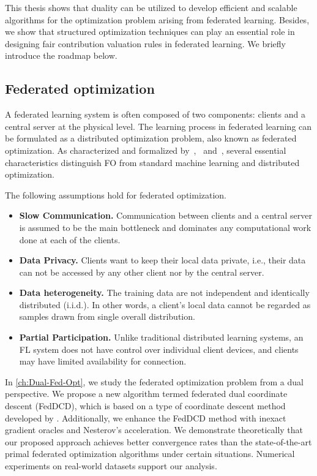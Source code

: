 This thesis shows that duality can be utilized to develop efficient and scalable algorithms for the optimization problem arising from federated learning. Besides, we show that structured optimization techniques can play an essential role in designing fair contribution valuation rules in federated learning. We briefly introduce the roadmap below. 

\subsection{Federated optimization} \label{sec:1-4-1}

A federated learning system is often composed of two components: clients and a central server at the physical level. The learning process in federated learning can be formulated as a distributed optimization problem, also known as federated optimization. As characterized and formalized by~\citet{wang2021field},~\citet{li2020federated} and~\citet{li2019convergence}, several essential characteristics distinguish FO from standard machine learning and distributed optimization. 

\begin{assumption} \label{assum:govern}
The following assumptions hold for federated optimization. 
  \begin{itemize}
    \item \textbf{Slow Communication.}  Communication between clients and a central server is assumed to be the main bottleneck and dominates any computational work done at each of the clients. 
    \item \textbf{Data Privacy.} Clients want to keep their local data private, i.e., their data can not be accessed by any other client nor by the central server.
    \item \textbf{Data heterogeneity.} The training data are not independent and identically distributed (i.i.d.). In other words, a client’s local data cannot be regarded as samples drawn from single overall distribution.
    \item \textbf{Partial Participation.} Unlike traditional distributed learning systems, an FL system does not have control over individual client devices, and clients may have limited availability for connection. 
\end{itemize}
\end{assumption}

In \autoref{ch:Dual-Fed-Opt}, we study the federated optimization problem from a dual perspective. We propose a new algorithm termed federated dual coordinate descent (FedDCD), which is based on a type of coordinate descent method developed by \citet{necoara2017random}.  Additionally, we
enhance the FedDCD method with inexact gradient oracles and Nesterov's acceleration. We demonstrate
theoretically that our proposed approach achieves better convergence rates than the state-of-the-art
primal federated optimization algorithms under certain situations. Numerical experiments on real-world
datasets support our analysis.

